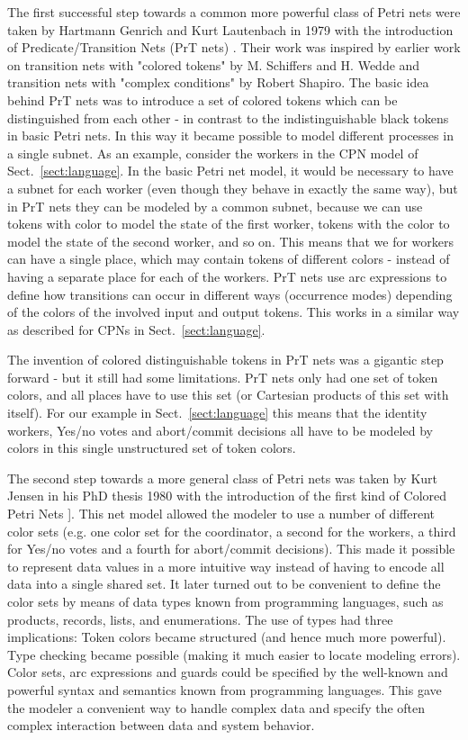 The first successful step towards a common more powerful class of
Petri nets were taken by Hartmann Genrich and Kurt Lautenbach in 1979
with the introduction of Predicate/Transition Nets (PrT nets)
\cite{genrich:81}. Their work was inspired by earlier work on
transition nets with "colored tokens" by M. Schiffers and H. Wedde and
transition nets with "complex conditions" by Robert Shapiro. The basic
idea behind PrT nets was to introduce a set of colored tokens which
can be distinguished from each other - in contrast to the
indistinguishable black tokens in basic Petri nets. In this way it
became possible to model different processes in a single subnet. As an
example, consider the workers in the CPN model of
Sect.~\ref{sect:language}. In the basic Petri net model, it would be
necessary to have a subnet for each worker (even though they behave in
exactly the same way), but in PrT nets they can be modeled by a common
subnet, because we can use tokens with color  to model
the state of the first worker, tokens with the color 
to model the state of the second worker, and so on. This means that we
for  workers can have a single  place, which
may contain tokens of  different colors - instead of having
a separate  place for each of the 
workers. PrT nets use arc expressions to define how transitions can
occur in different ways (occurrence modes) depending of the colors of
the involved input and output tokens. This works in a similar way as
described for CPNs in Sect.~\ref{sect:language}.

The invention of colored distinguishable tokens in PrT nets was a
gigantic step forward - but it still had some limitations. PrT nets
only had one set of token colors, and all places have to use this set
(or Cartesian products of this set with itself). For our example in
Sect.~\ref{sect:language} this means that the identity workers, Yes/no
votes and abort/commit decisions all have to be modeled by colors in
this single unstructured set of token colors.

The second step towards a more general class of Petri nets was taken
by Kurt Jensen in his PhD thesis 1980 with the introduction of the
first kind of Colored Petri Nets \cite{jensen:81}]. This net model
  allowed the modeler to use a number of different color sets
  (e.g. one color set for the coordinator, a second for the workers, a
  third for Yes/no votes and a fourth for abort/commit
  decisions). This made it possible to represent data values in a more
  intuitive way instead of having to encode all data into a single
  shared set. It later turned out to be convenient to define the color
  sets by means of data types known from programming languages, such
  as products, records, lists, and enumerations. The use of types had
  three implications: Token colors became structured (and hence much
  more powerful). Type checking became possible (making it much easier
  to locate modeling errors). Color sets, arc expressions and guards
  could be specified by the well-known and powerful syntax and
  semantics known from programming languages. This gave the modeler a
  convenient way to handle complex data and specify the often complex
  interaction between data and system behavior.

